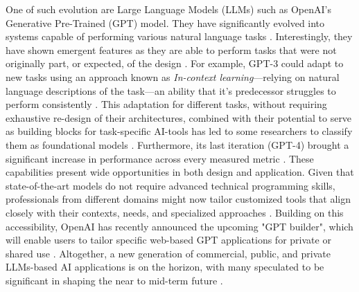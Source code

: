 \documentclass[sn-mathphys, Numbered]{sn-jnl}%
\theoremstyle{thmstyleone}%
\theoremstyle{thmstyletwo}%
\theoremstyle{thmstylethree}%
\begin{document}
One of such evolution are Large Language Models (LLMs) such as OpenAI's Generative Pre-Trained (GPT) model. They have significantly evolved into systems capable of performing various natural language tasks \parencite{brown_language_2020}. Interestingly, they have shown emergent features as they are able to perform tasks that were not originally part, or expected, of the design \parencite{wei_emergent_2022}. For example, GPT-3 could adapt to new tasks using an approach known as \textit{In-context learning}---relying on natural language descriptions of the task---an ability that it's predecessor struggles to perform consistently \parencite{brown_language_2020, wei_emergent_2022}. This adaptation for different tasks, without requiring exhaustive re-design of their architectures, combined with their potential to serve as building blocks for task-specific AI-tools has led to some researchers to classify them as foundational models \parencite{eloundou_gpts_2023, bommasani_opportunities_2022}.  Furthermore, its last iteration (GPT-4) brought a significant increase in performance across every measured metric \parencite{openai2023gpt4}.
These capabilities present wide opportunities in both design and application. Given that state-of-the-art models do not require advanced technical programming skills, professionals from different domains might now tailor customized tools that align closely with their contexts, needs, and specialized approaches \parencite{cain_gpteammate_2023}. Building on this accessibility, OpenAI has recently announced the upcoming "GPT builder", which will enable users to tailor specific web-based GPT applications for private or shared use \parencite{openaidevshowcase, openai_introducing_2023}. Altogether, a new generation of commercial, public, and private LLMs-based AI applications is on the horizon, with many speculated to be significant in shaping the near to mid-term future \parencite{bommasani_opportunities_2022, bubeck_sparks_2023}. 
\end{document}
